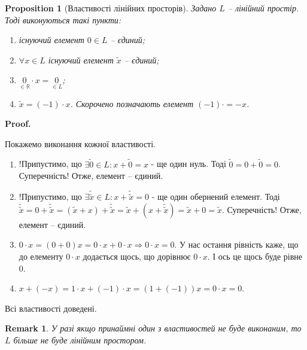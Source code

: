 \documentclass[a4paper, 10pt]{article}
\makeatletter
\theoremstyle{theoremdd}
\newtheorem{proposition}[theorem]{Proposition}
\newtheorem{remark}[theorem]{Remark}
\renewenvironment{proof}[1][Proof.\\]{\par
\pushQED{\hfill \qed}%
\normalfont \topsep6\p@\@plus6\p@\relax
\trivlist
\item\relax
{\bfseries
#1\@addpunct{.}}\hspace\labelsep\ignorespaces
}{%
\popQED\endtrivlist\@endpefalse
}
\makeatother
\begin{document}
	\begin{proposition}[Властивості лінійних просторів]
	Задано $L$ -- лінійний простір. Тоді виконуються такі пункти:
	\begin{enumerate}[nosep, wide=0pt, label={\arabic*)}]	
	\item існуючий елемент $0 \in L$ -- єдиний;
	\item $\forall x \in L$ існуючий елемент $\tilde{x}$ -- єдиний;
	\item $\underset{\in \mathbb{R}}{0} \cdot x = \underset{\in L}{0}$;
	\item $\tilde{x} = (-1) \cdot x$. Скорочено позначають елемент $(-1) \cdot = -x$.
	\end{enumerate}
	\end{proposition}
	
	\begin{proof}
	Покажемо виконання кожної властивості.
	\begin{enumerate}[topsep=-\parskip, wide=0pt, label={\arabic*)}]
	\item !Припустимо, що $\exists \tilde{0} \in L: x + \tilde{0} = x$ - ще один нуль. Тоді $\tilde{0} = 0 + \tilde{0} = 0$. Суперечність! Отже, елемент -- єдиний.
	\item !Припустимо, що $\exists \tilde{\tilde{x}} \in L: x + \tilde{\tilde{x}} = 0$ - ще один обернений елемент. Тоді $\tilde{\tilde{x}} = 0 + \tilde{\tilde{x}} = (\tilde{x} + x) + \tilde{\tilde{x}} = \tilde{x} + (x + \tilde{\tilde{x}}) = \tilde{x} + 0 = \tilde{x}$. Суперечність! Отже, елемент -- єдиний.
	\item $0 \cdot x = (0 + 0)x = 0\cdot x + 0 \cdot x \Rightarrow 0 \cdot x = 0$. У нас остання рівність каже, що до елементу $0 \cdot x$ додається щось, що дорівнює $0 \cdot x$. І ось це щось буде рівне $0$.
	\item $x + (-x) = 1 \cdot x + (-1) \cdot x = (1 + (-1))x = 0 \cdot x = 0$.
	\end{enumerate}
	Всі властивості доведені.
	\end{proof}
	
	\begin{remark}
	У разі якщо принаймні один з властивостей не буде виконаним, то $L$ більше не буде лінійним простором.
	\end{remark}
	
\end{document}
